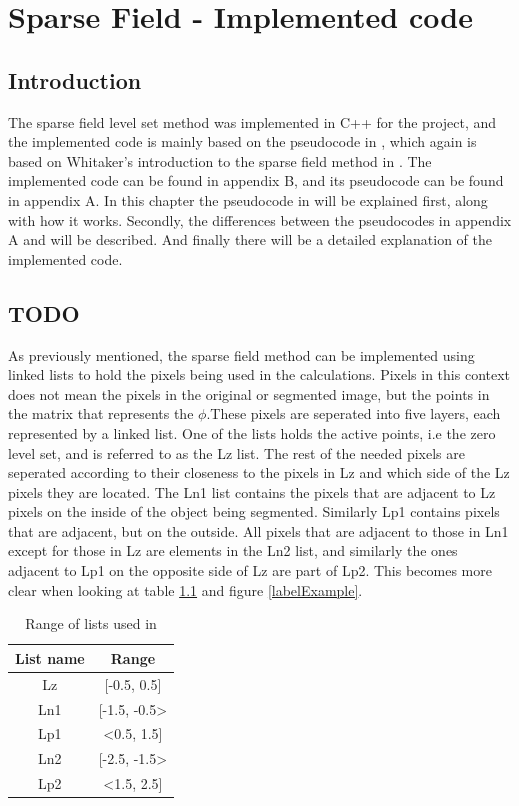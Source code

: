 \chapter{Sparse Field - Implemented code}
\section{Introduction}
The sparse field level set method was implemented in C++ for the project, and the implemented code is mainly based on the pseudocode in \cite{lankton09}, which again is based on Whitaker's introduction to the sparse field method in \cite{whitaker89}. The implemented code can be found in appendix B, and its pseudocode can be found in appendix A. In this chapter the pseudocode in \cite{lankton09} will be explained first, along with how it works. Secondly, the differences between the pseudocodes in appendix A and \cite{lankton09} will be described. And finally there will be a detailed explanation of the implemented code. 

\section{TODO}
As previously mentioned, the sparse field method can be implemented using linked lists to hold the pixels being used in the calculations. Pixels in this context does not mean the pixels in the original or segmented image, but the points in the matrix that represents the $\phi$.These pixels are seperated into five layers, each represented by a linked list. One of the lists holds the active points, i.e the zero level set, and is referred to as the Lz list. The rest of the needed pixels are seperated according to their closeness to the pixels in Lz and which side of the Lz pixels they are located. The Ln1 list contains the pixels that are adjacent to Lz pixels on the inside of the object being segmented. Similarly Lp1 contains pixels that are adjacent, but on the outside. All pixels that are adjacent to those in Ln1 except for those in Lz are elements in the Ln2 list, and similarly the ones adjacent to Lp1 on the opposite side of Lz are part of Lp2. This becomes more clear when looking at table \ref{rangeTab1} and figure \ref{labelExample}. 

\begin{table}[h] %
	\begin{tabular}{| c | c |} 
	\hline
	List name & Range\\
	\hline
	Lz & [-0.5, 0.5]\\
	Ln1 & [-1.5, -0.5>\\
	Lp1 & <0.5, 1.5]\\
	Ln2 & [-2.5, -1.5>\\
	Lp2 & <1.5, 2.5]\\
	\hline
	\end{tabular}
	\caption{Range of lists used in \cite{lankton09}}
	\label{rangeTab1}
\end{table}

